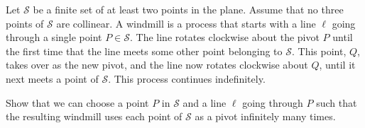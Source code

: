 Let 
$\mathcal{S}$
 be a finite set of at least two points in the plane. Assume that no three points of 
$\mathcal S$
 are collinear. A 
windmill
 is a process that starts with a line 
$\ell$
 going through a single point 
$P \in \mathcal S$.
 The line rotates clockwise about the 
pivot
$P$
 until the first time that the line meets some other point belonging to 
$\mathcal S$.
 This point, 
$Q$, 
 takes over as the new pivot, and the line now rotates clockwise about 
$Q$, 
 until it next meets a point of 
$\mathcal S$.
 This process continues indefinitely.


Show that we can choose a point 
$P$
 in 
$\mathcal S$
 and a line 
$\ell$
 going through 
$P$
 such that the resulting windmill uses each point of 
$\mathcal S$
 as a pivot infinitely many times.
